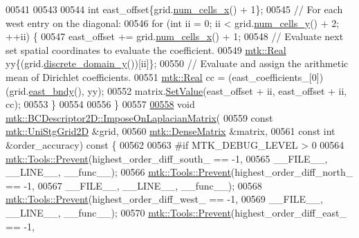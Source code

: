 \begin{DoxyCode}
00541 
00543 
00544   \textcolor{keywordtype}{int} east\_offset\{grid.\hyperlink{classmtk_1_1UniStgGrid2D_a2d182866a398aba8e4829590e85bf939}{num\_cells\_x}() + 1\};
00545   \textcolor{comment}{// For each west entry on the diagonal:}
00546   \textcolor{keywordflow}{for} (\textcolor{keywordtype}{int} ii = 0; ii < grid.\hyperlink{classmtk_1_1UniStgGrid2D_aed05a801cc9a76dba0ff203cea58a61a}{num\_cells\_y}() + 2; ++ii) \{
00547     east\_offset += grid.\hyperlink{classmtk_1_1UniStgGrid2D_a2d182866a398aba8e4829590e85bf939}{num\_cells\_x}() + 1;
00548     \textcolor{comment}{// Evaluate next set spatial coordinates to evaluate the coefficient.}
00549     \hyperlink{group__c01-roots_gac080bbbf5cbb5502c9f00405f894857d}{mtk::Real} yy\{(grid.\hyperlink{classmtk_1_1UniStgGrid2D_ac33a58d65105550dcf6f6b92b48b5105}{discrete\_domain\_y}())[ii]\};
00550     \textcolor{comment}{// Evaluate and assign the arithmetic mean of Dirichlet coefficients.}
00551     \hyperlink{group__c01-roots_gac080bbbf5cbb5502c9f00405f894857d}{mtk::Real} cc = (east\_coefficients\_[0])(grid.\hyperlink{classmtk_1_1UniStgGrid2D_a03f689eb29a6369b82ce1207c655d5ff}{east\_bndy}(), yy);
00552     matrix.\hyperlink{classmtk_1_1DenseMatrix_a784ce5784109ac86bfb9d8562b334b13}{SetValue}(east\_offset + ii, east\_offset + ii, cc);
00553   \}
00554 
00556 \}
00557 
\hypertarget{mtk__bc__descriptor__2d_8cc_source_l00558}{}\hyperlink{classmtk_1_1BCDescriptor2D_a35592617dda3b965b680b2a1355122f4}{00558} \textcolor{keywordtype}{void} \hyperlink{classmtk_1_1BCDescriptor2D_a35592617dda3b965b680b2a1355122f4}{mtk::BCDescriptor2D::ImposeOnLaplacianMatrix}(
00559     \textcolor{keyword}{const} \hyperlink{classmtk_1_1UniStgGrid2D}{mtk::UniStgGrid2D} &grid,
00560     \hyperlink{classmtk_1_1DenseMatrix}{mtk::DenseMatrix} &matrix,
00561     \textcolor{keyword}{const} \textcolor{keywordtype}{int} &order\_accuracy)\textcolor{keyword}{ const }\{
00562 
00563 \textcolor{preprocessor}{  #if MTK\_DEBUG\_LEVEL > 0}
00564   \hyperlink{classmtk_1_1Tools_a332324c6f25e66be9dff48c5987a3b9f}{mtk::Tools::Prevent}(highest\_order\_diff\_south\_ == -1,
00565                       \_\_FILE\_\_, \_\_LINE\_\_, \_\_func\_\_);
00566   \hyperlink{classmtk_1_1Tools_a332324c6f25e66be9dff48c5987a3b9f}{mtk::Tools::Prevent}(highest\_order\_diff\_north\_ == -1,
00567                       \_\_FILE\_\_, \_\_LINE\_\_, \_\_func\_\_);
00568   \hyperlink{classmtk_1_1Tools_a332324c6f25e66be9dff48c5987a3b9f}{mtk::Tools::Prevent}(highest\_order\_diff\_west\_ == -1,
00569                       \_\_FILE\_\_, \_\_LINE\_\_, \_\_func\_\_);
00570   \hyperlink{classmtk_1_1Tools_a332324c6f25e66be9dff48c5987a3b9f}{mtk::Tools::Prevent}(highest\_order\_diff\_east\_ == -1,

\end{DoxyCode}
